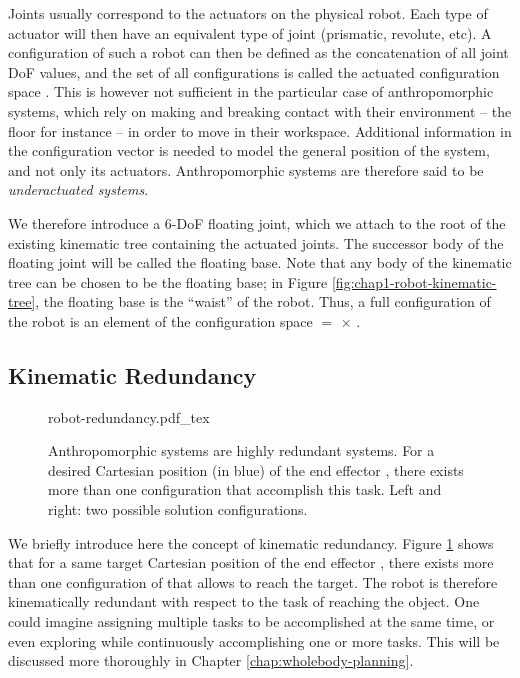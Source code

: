 Joints usually correspond to the actuators on the physical robot. Each
type of actuator will then have an equivalent type of joint
(prismatic, revolute, etc). A configuration \config{} of such a robot
can then be defined as the concatenation of all joint DoF values, and
the set of all configurations is called the actuated configuration
space {\actcspace}. This is however not sufficient in the particular
case of anthropomorphic systems, which rely on making and breaking
contact with their environment -- the floor for instance -- in order
to move in their workspace. Additional information in the
configuration vector is needed to model the general position of the
system, and not only its actuators. Anthropomorphic systems are
therefore said to be \emph{underactuated systems}.

We therefore introduce a 6-DoF floating joint, which we attach to the
root of the existing kinematic tree containing the actuated
joints. The successor body of the floating joint will be called the
floating base. Note that any body of the kinematic tree can be chosen
to be the floating base; in Figure
\ref{fig:chap1-robot-kinematic-tree}, the floating base is the
``waist'' of the robot. Thus, a full configuration \config{} of the
robot {\robot} is an element of the configuration space {\cspace} $=$
{\segroup} $\times$ {\actcspace}.
 
\subsection{Kinematic Redundancy}
\label{subsec:chap1-kinematic-redundancy}

\begin{figure}
  \centering
      {\def\svgwidth{0.8\linewidth}
        
                   {robot-redundancy.pdf_tex}}
      \caption{Anthropomorphic systems are highly redundant
        systems. For a desired Cartesian position (in blue) of the end
        effector , there exists more than one configuration
        \config{} that accomplish this task. Left and right: two
        possible solution configurations.}
      \label{fig:chap1-robot-redundancy}
\end{figure}

We briefly introduce here the concept of kinematic redundancy. Figure
\ref{fig:chap1-robot-redundancy} shows that for a same target
Cartesian position of the end effector , there exists more
than one configuration of {\robot} that allows  to
reach the target. The robot {\robot} is therefore
kinematically redundant with respect to the task of reaching the
object. One could imagine assigning multiple tasks to be accomplished
at the same time, or even exploring {\cspace} while continuously
accomplishing one or more tasks. This will be discussed more
thoroughly in Chapter \ref{chap:wholebody-planning}.

